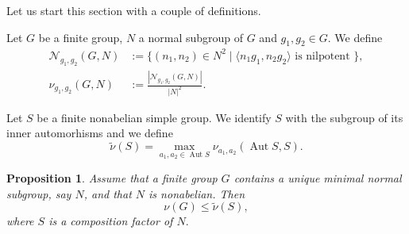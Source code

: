 \documentclass{amsart}
\DeclareMathOperator{\aut}{Aut}
\newtheorem{prop}[thm]{Proposition} \newtheorem{rem}[thm]{Remark}
\numberwithin{equation}{section}
\begin{document}
Let us start this section with a couple of definitions.


\begin{defn}Let $G$ be a finite group, $N$ a normal subgroup of $G$ and $g_1, g_2\in G.$ We define
	$$\begin{aligned}\mathcal N_{g_1,g_2}(G,N)&:=\{(n_1,n_2)\in N^2\mid\langle n_1g_1, n_2g_2\rangle \text { is nilpotent }\},\\\nu_{g_1,g_2}(G,N)&:=\frac{|\mathcal N_{g_1,g_2}(G,N)|}{|N|^2}.
		\end{aligned}$$
\end{defn}
\begin{defn}
	Let $S$ be a finite nonabelian simple group.
	We identify $S$ with the subgroup of its inner automorhisms and we define
	$$\tilde\nu(S)=\max_{a_1,a_2\in \aut S}\nu_{a_1,a_2}(\aut S, S).$$
\end{defn}
\begin{prop}\label{mono}
	Assume that a finite group $G$ contains a unique minimal normal subgroup, say $N$, and that $N$ is nonabelian. Then
	$$\nu(G)\leq \tilde\nu(S),$$
	where $S$ is a composition factor of $N.$
\end{prop}
\end{document}
